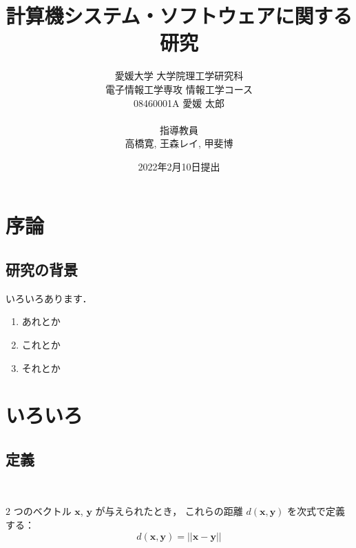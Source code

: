 \documentclass{thesis}
\begin{document}
\title{{\bf 計算機システム・ソフトウェアに関する研究}}
\author{愛媛大学 大学院理工学研究科\\
電子情報工学専攻 情報工学コース\\
08460001A  愛媛 太郎\\
\ \vspace{0.5cm} \\
指導教員\\
高橋寛, 王森レイ, 甲斐博}
\date{2022年2月10日提出}
\maketitle

\tableofcontents

\chapter{序論}

\section{研究の背景}

いろいろあります\cite{ソフトウェア工学の基礎知識,ファジィ学会誌-解説,Fenton_and_Kaposi_1987}．

\begin{enumerate}[(1)]
\item あれとか
\item これとか
\item それとか
\end{enumerate}

\chapter{いろいろ}

\section{定義}

\begin{definition}[距離] \label{def:距離} ~

\begin{rm}
$2$ つのベクトル $\boldsymbol{x}$, $\boldsymbol{y}$ が与えられたとき，
これらの距離 $d(\boldsymbol{x},\boldsymbol{y})$ を次式で定義する：
%
\begin{equation}\label{eqn:距離}
	d(\boldsymbol{x},\boldsymbol{y}) = %
	|| \boldsymbol{x} - \boldsymbol{y} ||
\end{equation}
\end{rm}
%
\QED
\end{definition}
\end{document}
